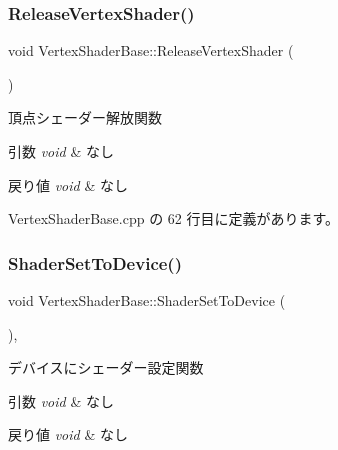 \subsubsection{\texorpdfstring{Release\+Vertex\+Shader()}{ReleaseVertexShader()}}
{\footnotesize\ttfamily void Vertex\+Shader\+Base\+::\+Release\+Vertex\+Shader (\begin{DoxyParamCaption}{ }\end{DoxyParamCaption})}



頂点シェーダー解放関数 


\begin{DoxyParams}{引数}
{\em void} & なし \\
\hline
\end{DoxyParams}

\begin{DoxyRetVals}{戻り値}
{\em void} & なし \\
\hline
\end{DoxyRetVals}


 Vertex\+Shader\+Base.\+cpp の 62 行目に定義があります。

\mbox{\label{class_vertex_shader_base_a72c88a06560f530be7cb04923a916904}} 
\subsubsection{\texorpdfstring{Shader\+Set\+To\+Device()}{ShaderSetToDevice()}}
{\footnotesize\ttfamily void Vertex\+Shader\+Base\+::\+Shader\+Set\+To\+Device (\begin{DoxyParamCaption}{ }\end{DoxyParamCaption})\hspace{0.3cm}{\ttfamily [override]}, {\ttfamily [virtual]}}



デバイスにシェーダー設定関数 


\begin{DoxyParams}{引数}
{\em void} & なし \\
\hline
\end{DoxyParams}

\begin{DoxyRetVals}{戻り値}
{\em void} & なし \\
\hline
\end{DoxyRetVals}


